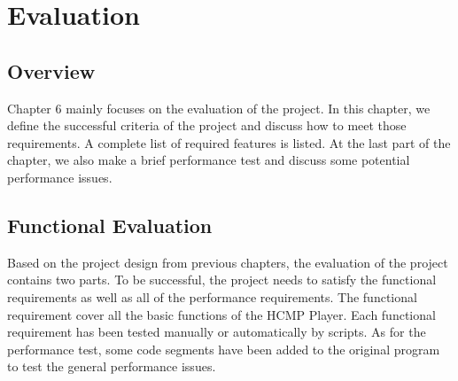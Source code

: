 
\chapter{Evaluation} %



\ifpdf
    \graphicspath{{X/figures/PNG/}{X/figures/PDF/}{X/figures/}}
\else
    \graphicspath{{X/figures/EPS/}{X/figures/}}
\fi


\section{Overview}
Chapter 6 mainly focuses on the evaluation of the project. In
this chapter, we define the successful criteria of the project and discuss
how to meet those requirements. A complete list of required features is
listed. At the last part of the chapter, we also make a brief performance test 
and discuss some potential performance issues.

\section{Functional Evaluation}
Based on the project design from previous chapters, the evaluation of the 
project contains two parts. To be successful, the project needs to satisfy 
the functional requirements as well as all of the performance 
requirements. The functional requirement cover all the basic functions of 
the HCMP Player. Each functional requirement has been tested manually or 
automatically by scripts. As for the performance test, some code segments 
have been added to the original program to test the general performance issues.

